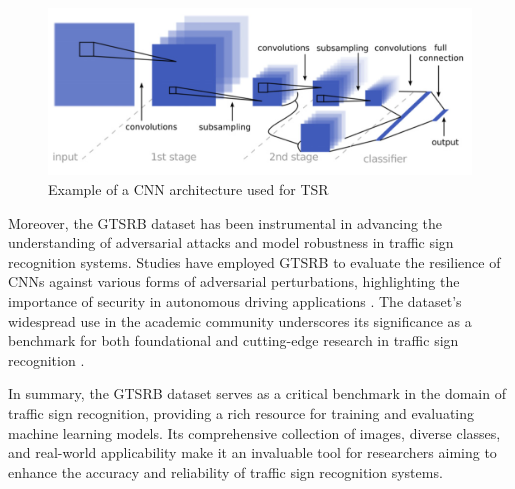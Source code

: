     \begin{figure}[H]
      \centering
      \includegraphics[width=1\textwidth]{images/figure4.png}
      \caption{Example of a CNN architecture used for TSR}
      \label{fig:fig4}
  \end{figure}
    Moreover, the GTSRB dataset has been instrumental in advancing the understanding of adversarial attacks and model robustness in traffic sign recognition systems. Studies have employed GTSRB to evaluate the resilience of CNNs against various forms of adversarial perturbations, highlighting the importance of security in autonomous driving applications \cite{10.1109/aipr50011.2020.9425267,10.48550/arxiv.1911.07399}. The dataset's widespread use in the academic community underscores its significance as a benchmark for both foundational and cutting-edge research in traffic sign recognition \cite{10.1109/cvpr42600.2020.00038}.
    
    In summary, the GTSRB dataset serves as a critical benchmark in the domain of traffic sign recognition, providing a rich resource for training and evaluating machine learning models. Its comprehensive collection of images, diverse classes, and real-world applicability make it an invaluable tool for researchers aiming to enhance the accuracy and reliability of traffic sign recognition systems.
    
    